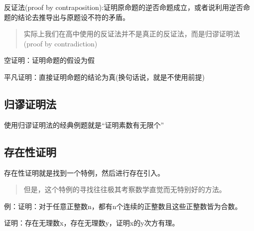 \documentclass[12pt,a4paper,oneside]{ctexart}
\begin{document}
反证法(proof by contraposition):证明原命题的逆否命题成立，或者说利用逆否命题的结论去推导出与原题设不符的矛盾。

\begin{quote}
实际上我们在高中使用的反证法并不是真正的反证法，而是归谬证明法(proof by contradiction)
\end{quote}

空证明：证明命题的假设为假

平凡证明：直接证明命题的结论为真(换句话说，就是不使用前提)

\subsection*{归谬证明法}

使用归谬证明法的经典例题就是``证明素数有无限个''

\subsection*{存在性证明}

存在性证明就是找到一个特例，然后进行存在引入。

\begin{quote}
但是，这个特例的寻找往往极其考察数学直觉而无特别好的方法。
\end{quote}

例：证明：对于任意正整数n，都有n个连续的正整数且这些正整数皆为合数。

证明：存在无理数x，存在无理数y，证明x的y次方有理。
\end{document}
